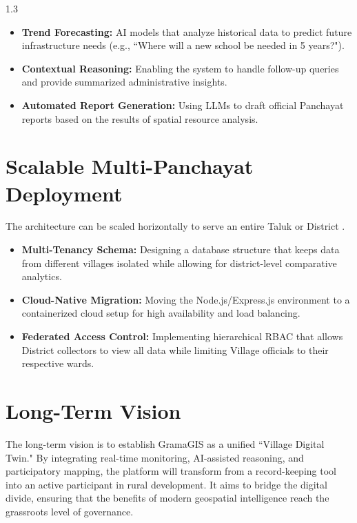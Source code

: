 \begin{spacing}{1.3}
\begin{itemize}
    \item \textbf{Trend Forecasting:} AI models that analyze historical data to predict future infrastructure needs (e.g., ``Where will a new school be needed in 5 years?").
    \item \textbf{Contextual Reasoning:} Enabling the system to handle follow-up queries and provide summarized administrative insights.
    \item \textbf{Automated Report Generation:} Using LLMs to draft official Panchayat reports based on the results of spatial resource analysis.
\end{itemize}



\section{Scalable Multi-Panchayat Deployment}

The architecture can be scaled horizontally to serve an entire Taluk or District \cite{fu2020webgis}.

\begin{itemize}
    \item \textbf{Multi-Tenancy Schema:} Designing a database structure that keeps data from different villages isolated while allowing for district-level comparative analytics.
    \item \textbf{Cloud-Native Migration:} Moving the Node.js/Express.js environment to a containerized cloud setup for high availability and load balancing.
    \item \textbf{Federated Access Control:} Implementing hierarchical RBAC that allows District collectors to view all data while limiting Village officials to their respective wards.
\end{itemize}

\section{Long-Term Vision}

The long-term vision is to establish GramaGIS as a unified ``Village Digital Twin." By integrating real-time monitoring, AI-assisted reasoning, and participatory mapping, the platform will transform from a record-keeping tool into an active participant in rural development. It aims to bridge the digital divide, ensuring that the benefits of modern geospatial intelligence reach the grassroots level of governance.

\end{spacing}